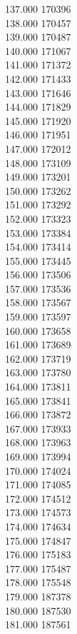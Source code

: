 { 137.000	170396 \\
 138.000	170457 \\
 139.000	170487 \\
 140.000	171067 \\
 141.000	171372 \\
 142.000	171433 \\
 143.000	171646 \\
 144.000	171829 \\
 145.000	171920 \\
 146.000	171951 \\
 147.000	172012 \\
 148.000	173109 \\
 149.000	173201 \\
 150.000	173262 \\
 151.000	173292 \\
 152.000	173323 \\
 153.000	173384 \\
 154.000	173414 \\
 155.000	173445 \\
 156.000	173506 \\
 157.000	173536 \\
 158.000	173567 \\
 159.000	173597 \\
 160.000	173658 \\
 161.000	173689 \\
 162.000	173719 \\
 163.000	173780 \\
 164.000	173811 \\
 165.000	173841 \\
 166.000	173872 \\
 167.000	173933 \\
 168.000	173963 \\
 169.000	173994 \\
 170.000	174024 \\
 171.000	174085 \\
 172.000	174512 \\
 173.000	174573 \\
 174.000	174634 \\
 175.000	174847 \\
 176.000	175183 \\
 177.000	175487 \\
 178.000	175548 \\
 179.000	187378 \\
 180.000	187530 \\
 181.000	187561 \\
}
